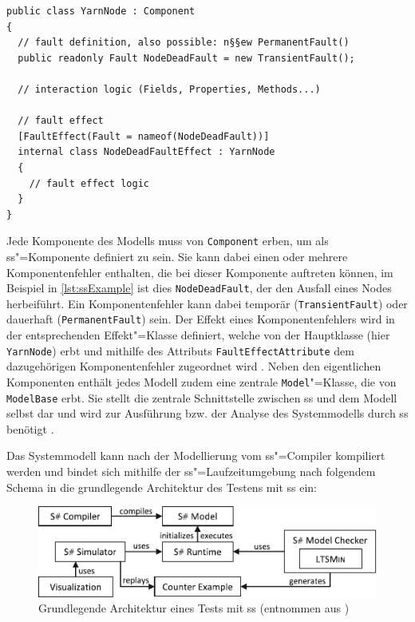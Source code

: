 \begin{lstlisting}[label=lst:ssExample,style=cs,
caption={Grundlegender Aufbau einer \glsentryshort{ss}"=Komponente.}]
public class YarnNode : Component
{
  // fault definition, also possible: n§§ew PermanentFault()
  public readonly Fault NodeDeadFault = new TransientFault();
  
  // interaction logic (Fields, Properties, Methods...)
  
  // fault effect
  [FaultEffect(Fault = nameof(NodeDeadFault))]
  internal class NodeDeadFaultEffect : YarnNode
  {
    // fault effect logic
  }
}
\end{lstlisting}

Jede Komponente des Modells muss von \texttt{Component} erben, um als \gls{ss}"=Komponente definiert zu sein.
Sie kann dabei einen oder mehrere Komponentenfehler enthalten, die bei dieser Komponente auftreten können, im Beispiel in \cref{lst:ssExample} ist dies \texttt{NodeDeadFault}, der den Ausfall eines Nodes herbeiführt.
Ein Komponentenfehler kann dabei temporär (\texttt{TransientFault}) oder dauerhaft (\texttt{PermanentFault}) sein.
Der Effekt eines Komponentenfehlers wird in der entsprechenden Effekt"=Klasse definiert, welche von der Hauptklasse (hier \texttt{YarnNode}) erbt und mithilfe des Attributs \texttt{FaultEffectAttribute} dem dazugehörigen Komponentenfehler zugeordnet wird \cite{Habermaier2016,Habermaier2015}.
Neben den eigentlichen Komponenten enthält jedes Modell zudem eine zentrale \texttt{Model}"=Klasse, die von \texttt{ModelBase} erbt.
Sie stellt die zentrale Schnittstelle zwischen \gls{ss} und dem Modell selbst dar und wird zur Ausführung bzw. der Analyse des Systemmodells durch \gls{ss} benötigt \cite{SSWikiModels}.

Das Systemmodell kann nach der Modellierung vom \gls{ss}"=Compiler kompiliert werden und bindet sich mithilfe der \gls{ss}"=Laufzeitumgebung nach folgendem Schema in die grundlegende Architektur des Testens mit \gls{ss} ein:

\begin{figure}[h]
    \includegraphics{./resources/ssharpArchitecture.pdf}
    \caption[Grundlegende Architektur eines Tests mit ]
    {Grundlegende Architektur eines Tests mit \gls{ss} (entnommen aus \cite{Habermaier2016})}
    \label{fig:ssharpTestApproach}
\end{figure}

